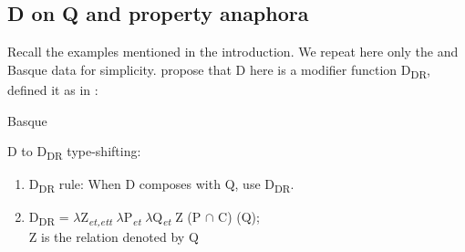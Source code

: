 \documentclass[output=paper,
modfonts
]{langscibook}
\begin{document}
\subsection{D on Q and property anaphora}

Recall the examples mentioned in the introduction. We repeat here only the  and Basque data for simplicity. \citet{etxeberria-giannakidou2009, etxeberria-giannakidou2014} propose that D here is a modifier function D\textsubscript{DR}, defined it as in :

\ea\label{ex:etxeberria:16}
 \citep{Giannakidou2004}
\z
\z \newpage

\ea\label{ex:etxeberria:17} 
Basque \citep{etxeberria2005}
\z
\z

\ea\label{ex:etxeberria:18}
	D to D\textsubscript{DR} type-shifting:
	\begin{enumerate}
		\item D\textsubscript{DR} rule: When D composes with Q, use D\textsubscript{DR}.
		\item D\textsubscript{DR} = $\lambda$Z\textsubscript{\textit{et,ett}} $\lambda$P\textsubscript{\textit{et}} $\lambda$Q\textsubscript{\textit{et}} Z (P $\cap$ C) (Q);\\ Z is the relation denoted by Q
	\end{enumerate}
\z
\end{document}
